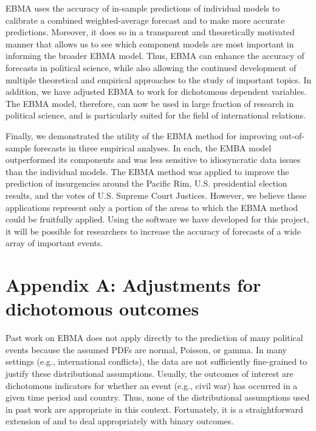 EBMA uses the accuracy of in-sample predictions of individual models
to calibrate a combined weighted-average forecast and to make more
accurate predictions.  Moreover, it does so in a transparent and
theoretically motivated manner that allows us to see which component
models are most important in informing the broader EBMA model.  Thus,
EBMA can enhance the accuracy of forecasts in political science, while
also allowing the continued development of multiple theoretical and
empirical approaches to the study of important topics. In addition, we
have adjusted EBMA to work for dichotomous dependent variables.  The
EBMA model, therefore, can now be used in large fraction of research
in political science, and is particularly suited for the field of
international relations.

Finally, we demonstrated the utility of the EBMA method for improving
out-of-sample forecasts in three empirical analyses.  In each, the
EMBA model outperformed its components and was less sensitive to
idiosyncratic data issues than the individual models.  The EBMA method
was applied to improve the prediction of insurgencies around the
Pacific Rim, U.S. presidential election results, and the votes of
U.S. Supreme Court Justices. However, we believe these applications
represent only a portion of the areas to which the EBMA method could
be fruitfully applied.  Using the software we have developed for this
project, it will be possible for researchers to increase the accuracy
of forecasts of a wide array of important events.



\newpage
\appendix


\section*{Appendix A: Adjustments for dichotomous outcomes}

Past work on EBMA does not apply directly to the prediction of many
political events because the assumed PDFs are normal, Poisson, or
gamma. In many settings (e.g., international conflicts), the data are
not sufficiently fine-grained to justify these distributional
assumptions.  Usually, the outcomes of interest are dichotomous
indicators for whether an event (e.g., civil war) has occurred in a
given time period and country. Thus, none of the distributional
assumptions used in past work are appropriate in this context.
Fortunately, it is a straightforward extension of
\citet{Sloughter:2007} and \citet{Sloughter:2010} to deal
appropriately with binary outcomes.


